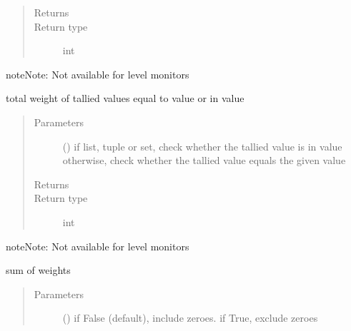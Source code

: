 \documentclass[letterpaper,10pt,english]{sphinxmanual}
\begin{document}
\begin{fulllineitems}
\begin{fulllineitems}
\begin{quote}
\begin{description}
\item[{Returns}] \leavevmode
{}

\item[{Return type}] \leavevmode
int

\end{description}\end{quote}

\begin{sphinxadmonition}{note}{Note:}
Not available for level monitors
\end{sphinxadmonition}

\end{fulllineitems}


\begin{fulllineitems}
\label{\detokenize{Reference:salabim.Monitor.value_weight}}
total weight of tallied values equal to value or in value
\begin{quote}\begin{description}
\item[{Parameters}] \leavevmode
{} () \textendash{} if list, tuple or set, check whether the tallied value is in value 
otherwise, check whether the tallied value equals the given value

\item[{Returns}] \leavevmode
{}

\item[{Return type}] \leavevmode
int

\end{description}\end{quote}

\begin{sphinxadmonition}{note}{Note:}
Not available for level monitors
\end{sphinxadmonition}

\end{fulllineitems}


\begin{fulllineitems}
\label{\detokenize{Reference:salabim.Monitor.weight}}
sum of weights
\begin{quote}\begin{description}
\item[{Parameters}] \leavevmode
{} () \textendash{} if False (default), include zeroes. if True, exclude zeroes


\end{description}
\end{quote}
\end{fulllineitems}
\end{fulllineitems}
\end{document}
